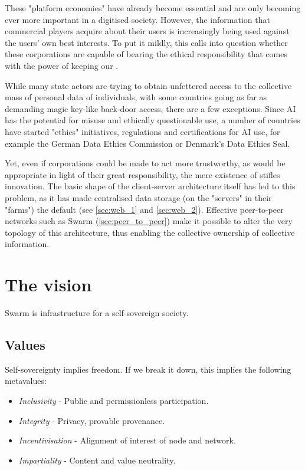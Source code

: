 These "platform economies" have already become essential and are only becoming ever more important in a digitised society. However, the information that commercial players acquire about their users is increasingly being used against the users' own best interests. To put it mildly, this calls into question whether these corporations are capable of bearing the ethical responsibility that comes with the power of keeping our .

While many state actors are trying to obtain unfettered access to the collective mass of personal data of individuals, with some countries going as far as demanding magic key-like back-door access, there are a few exceptions. Since AI has the potential for misuse and ethically questionable use, a number of countries have started "ethics" initiatives, regulations and certifications for AI use, for example the German Data Ethics Commission or Denmark's Data Ethics Seal. 

Yet, even if corporations could be made to act more trustworthy, as would be appropriate in light of their great responsibility, the mere existence of  stifles innovation. The basic shape of the client-server architecture itself has led to this problem, as it has made centralised data storage (on the "servers" in their "farms") the default (see \ref{sec:web_1} and \ref{sec:web_2}). Effective peer-to-peer networks such as Swarm (\ref{sec:peer_to_peer}) make it possible to alter the very topology of this architecture, thus enabling the collective ownership of collective information. 


\section{The vision  \statusorange}\label{sec:vision}

\begin{displayquote}
Swarm is infrastructure for a self-sovereign society. 
\end{displayquote}


\subsection{Values \statusorange}\label{sec:values}

Self-sovereignty implies freedom. If we break it down, this implies the following metavalues: 

\begin{itemize}[noitemsep]
\item \emph{Inclusivity} - Public and permissionless participation.  
\item \emph{Integrity} - Privacy, provable provenance. 
\item \emph{Incentivisation} - Alignment of interest of node and network.
\item \emph{Impartiality} -  Content and value neutrality.  
\end{itemize}

